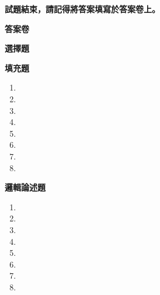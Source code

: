 \documentclass[a4paper, 12pt, addpoints]{exam}
\begin{document}
\begin{center}
    \textbf{\Large 試題結束，請記得將答案填寫於答案卷上。}
\end{center}

\newpage

\begin{center}
    \huge \textbf{答案卷}
\end{center}

\noindent \large \textbf{選擇題}
\begin{table}[H]
\end{table}

\noindent \large \textbf{填充題}
\begin{multicols}{2}
\begin{enumerate}[leftmargin=*]
    \item \makebox[0.3\textwidth]{\enspace\hrulefill}
    \item \makebox[0.3\textwidth]{\enspace\hrulefill}
    \item \makebox[0.3\textwidth]{\enspace\hrulefill}
    \item \makebox[0.3\textwidth]{\enspace\hrulefill}
    \item \makebox[0.3\textwidth]{\enspace\hrulefill}
    \item \makebox[0.3\textwidth]{\enspace\hrulefill}
    \item \makebox[0.3\textwidth]{\enspace\hrulefill}
    \item \makebox[0.3\textwidth]{\enspace\hrulefill}
\end{enumerate}
\end{multicols}

\noindent \large \textbf{邏輯論述題}

\begin{enumerate}[leftmargin=*]
    \item \hspace{1em}  
    \fillwithlines{8em}
    \item \hspace{1em}  
    \fillwithlines{8em}
    \item \hspace{1em}  
    \fillwithlines{8em}
    \item \hspace{1em}  
    \fillwithlines{8em}
    \item \hspace{1em}  
    \fillwithlines{8em}
    \item \hspace{1em}  
    \fillwithlines{8em}
    \item \hspace{1em}  
    \fillwithlines{8em}
    \item \hspace{1em}  
    \fillwithlines{8em}
\end{enumerate}
\end{document}
